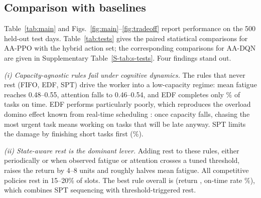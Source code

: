 \subsection{Comparison with baselines}\label{sec:main}
Table~\ref{tab:main} and Figs.~\ref{fig:main}--\ref{fig:tradeoff} report performance on the 500 held-out test days. Table~\ref{tab:tests} gives the paired statistical comparisons for AA-PPO with the hybrid action set; the corresponding comparisons for AA-DQN are given in Supplementary Table~\ref{S-tab:s-tests}. Four findings stand out.

\emph{(i) Capacity-agnostic rules fail under cognitive dynamics.} The rules that never rest (FIFO, EDF, SPT) drive the worker into a low-capacity regime: mean fatigue reaches 0.48--0.55, attention falls to 0.46--0.54, and EDF completes only \EDFOnTimePct\% of tasks on time. EDF performs particularly poorly, which reproduces the overload domino effect known from real-time scheduling \cite{buttazzo2011}: once capacity falls, chasing the most urgent task means working on tasks that will be late anyway. SPT limits the damage by finishing short tasks first (\SPTOnTimePct\%).

\emph{(ii) State-aware rest is the dominant lever.} Adding rest to these rules, either periodically or when observed fatigue or attention crosses a tuned threshold, raises the return by 4--8 units and roughly halves mean fatigue. All competitive policies rest in 15--20\% of slots. The best rule overall is \bestHeur{} (return \bestHeurReturn, on-time rate \bestHeurOnTimePct\%), which combines SPT sequencing with threshold-triggered rest.


